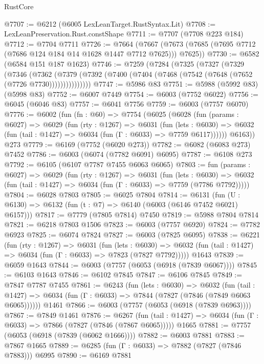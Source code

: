 \begin{lexlean}{RustCore}
\begin{coremodule}
{\begin{coremodule}
{{{{{{{{{{{{{{{{{{{{{{{{{{{{{{{{{{{{{{{{{{{{{{{@7707 := @6212 (@6005 LexLeanTarget.RustSyntax.Lit)
@7708 := LexLeanPreservation.Rust.constShape
@7711 := @7707 (@7708 @223 @184)
@7712 := @7704 @7711
@7726 := @7664
    (@7667 (@7673 (@7685 (@7695 @7712 (@7686 @124 @184 @14 @1628 @1447 @7712 @7625))) @7625))
@7730 := @6582 (@6584 @151 @187 @1623)
@7746 := @7259
    (@7284
      (@7325
        (@7327
          (@7329
            (@7346
              (@7362
                (@7379 (@7392 (@7400 (@7404 (@7468 (@7542 (@7648 (@7652 (@7726 @7730)))))))))))))))
@7747 := @5986 @83
@7751 := @5988 (@5992 @83) (@5998 @83)
@7752 := @6007 @7449
@7754 := @6003 (@7752 @6022)
@7756 := @6045 (@6046 @83)
@7757 := @6041 @7756
@7759 := @6003 (@7757 @6070)
@7776 := @6002
    (fun (fn : @60) =>
    @7754
      (@6025
        (@6028
          (fun (params : @6027) =>
          @6029
            (fun (rty : @1267) =>
            @6031
              (fun (lets : @6030) =>
              @6032 (fun (tail : @1427) => @6034 (fun (Γ : @6033) => @7759 @6117))))))
        @6163))
    @273
@7779 := @6169 (@7752 (@6020 @273))
@7782 := @6082 (@6083 @273) @7452
@7786 := @6003 (@6074 (@7782 @6091) @6095)
@7787 := @6108 @273
@7792 := @6105 (@6107 @7787 @7455 @6063 @6065)
@7803 := fun (params : @6027) =>
  @6029
    (fun (rty : @1267) =>
    @6031
      (fun (lets : @6030) =>
      @6032 (fun (tail : @1427) => @6034 (fun (Γ : @6033) => @7759 (@7786 @7792)))))
@7804 := @6028 @7803
@7805 := @6025 @7804
@7814 := @6131 (fun (U : @6130) => @6132 (fun (t : @7) => @6140 (@6003 (@6146 @7452 @6021) @6157)))
@7817 := @7779 (@7805 @7814) @7450
@7819 := @5988 @7804 @7814
@7821 := @6218 @7803 @1506
@7823 := @6003 (@7757 @6920)
@7824 := @7782 @6923
@7825 := @6074 @7824
@7827 := @6003 (@7825 @6095)
@7838 := @6221
    (fun (rty : @1267) =>
    @6031
      (fun (lets : @6030) =>
      @6032 (fun (tail : @1427) => @6034 (fun (Γ : @6033) => @7823 (@7827 @7792)))))
    @1643
@7839 := @6059 @1643
@7844 := @6003 (@7757 (@6053 (@6918 (@7839 @6067))))
@7845 := @6103 @1643
@7846 := @6102 @7845
@7847 := @6106 @7845
@7849 := @7847 @7787 @7455
@7861 := @6243
    (fun (lets : @6030) =>
    @6032
      (fun (tail : @1427) => @6034 (fun (Γ : @6033) => @7844 (@7827 (@7846 (@7849 @6063 @6065))))))
    @1461
@7866 := @6003 (@7757 (@6053 (@6918 (@7839 @6963))))
@7867 := @7849 @1461
@7876 := @6267
    (fun (tail : @1427) => @6034 (fun (Γ : @6033) => @7866 (@7827 (@7846 (@7867 @6065)))))
    @1665
@7881 := @7757 (@6053 (@6918 (@7839 (@6062 @1666))))
@7882 := @6003 @7881
@7883 := @7867 @1665
@7889 := @6285 (fun (Γ : @6033) => @7882 (@7827 (@7846 @7883))) @6995
@7890 := @6169 @7881
}}}}}}}}}}}}}}}}}}}}}}}}}}}}}}}}}}}}}}}}}}}}}}}
\end{coremodule}}
\end{coremodule}
\end{lexlean}
